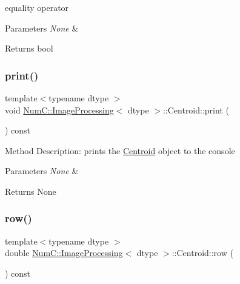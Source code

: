 equality operator


\begin{DoxyParams}{Parameters}
{\em None} & \\
\hline
\end{DoxyParams}
\begin{DoxyReturn}{Returns}
bool 
\end{DoxyReturn}
\mbox{\label{class_num_c_1_1_image_processing_1_1_centroid_aa1f721fbbeebf4409a26103f1a2e3615}} 
\subsubsection{\texorpdfstring{print()}{print()}}
{\footnotesize\ttfamily template$<$typename dtype $>$ \\
void \mbox{\hyperlink{class_num_c_1_1_image_processing}{Num\+C\+::\+Image\+Processing}}$<$ dtype $>$\+::Centroid\+::print (\begin{DoxyParamCaption}{ }\end{DoxyParamCaption}) const\hspace{0.3cm}{\ttfamily [inline]}}

Method Description\+: prints the \mbox{\hyperlink{class_num_c_1_1_image_processing_1_1_centroid}{Centroid}} object to the console


\begin{DoxyParams}{Parameters}
{\em None} & \\
\hline
\end{DoxyParams}
\begin{DoxyReturn}{Returns}
None 
\end{DoxyReturn}
\mbox{\label{class_num_c_1_1_image_processing_1_1_centroid_a59cd9d66283c26d813a6b36cfc92689c}} 
\subsubsection{\texorpdfstring{row()}{row()}}
{\footnotesize\ttfamily template$<$typename dtype $>$ \\
double \mbox{\hyperlink{class_num_c_1_1_image_processing}{Num\+C\+::\+Image\+Processing}}$<$ dtype $>$\+::Centroid\+::row (\begin{DoxyParamCaption}{ }\end{DoxyParamCaption}) const\hspace{0.3cm}{\ttfamily [inline]}}

